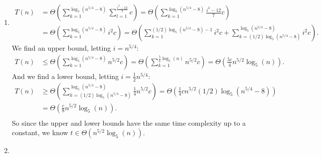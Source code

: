 \documentclass[10pt,oneside,reqno]{amsart}
\theoremstyle{plain}
\theoremstyle{definition}
\begin{document}
\begin{enumerate}[label=\arabic*.]
\item 
\begin{equation}
\begin{aligned}
T(n) &= \Theta\left(\sum_{k = 1}^{\log_5(n^{5/4} - 8)} \sum_{l = 1}^{\frac{i^2 - 12}{7}}c \right) = \Theta\left(\sum_{k = 1}^{\log_5(n^{5/4} - 8)} \frac{i^2 - 12}{7}c \right) \\
&=  \Theta\left(\sum_{k = 1}^{\log_5(n^{5/4} - 8)} i^2 c \right)  = \Theta\left(\sum_{k = 1}^{(1/2)\log_5(n^{5/4} - 8) - 1} i^2 c  + \sum_{k = (1/2)\log_5(n^{5/4} - 8)}^{\log_5(n^{5/4} - 8)} i^2 c \right). 
\end{aligned}
\end{equation}
We find an upper bound, letting $i = n^{5/4}$:
\begin{equation}
\begin{aligned}
T(n) &\leq \Theta\left(\sum_{k = 1}^{\log_5(n^{5/4} - 8)} n^{5/2} c \right) = \Theta\left(\sum_{k = 1}^{\frac{5}{4}\log_5(n)} n^{5/2} c \right) = \Theta\left( \frac{5c}{4}n^{5/2}\log_5(n) \right). 
\end{aligned}
\end{equation}
And we find a lower bound, letting $i = \frac{1}{2}n^{5/4}$:
\begin{equation}
\begin{aligned}
T(n) &\geq \Theta\left(\sum_{k = (1/2)\log_5(n^{5/4} - 8)}^{\log_5(n^{5/4} - 8)} \frac{1}{4} n^{5/2} c \right) = \Theta\left(\frac{1}{4}c n^{5/2}(1/2)\log_5(n^{5/4} - 8) \right)\\
&= \Theta\left(\frac{c}{8}n^{5/2}\log_5(n) \right). \\
\end{aligned}
\end{equation}
So since the upper and lower bounds have the same time complexity up to a constant, we know $t \in \Theta\left(n^{5/2}\log_5(n) \right)$. 

\item 


\end{enumerate}
\end{document}
